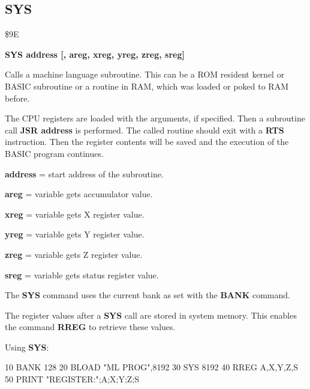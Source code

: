 
\newpage
\subsection{SYS}
\begin{description}[leftmargin=3cm,style=nextline]
\item [Token:] \$9E
\item [Format:] {\bf SYS address [, areg, xreg, yreg, zreg, sreg]}
\item [Usage:]  Calls a machine language subroutine.
                This can be a ROM resident kernel or BASIC subroutine
                or a routine in RAM, which was loaded or poked
                to RAM before.

               The CPU registers are loaded with the arguments,
               if specified. Then a subroutine call {\bf JSR address}
               is performed. The called routine should exit with
               a {\bf RTS} instruction. Then the register contents
               will be saved and the execution of the BASIC program
               continues.

               {\bf address} = start address of the subroutine.

               {\bf areg} = variable gets accumulator value.

               {\bf xreg} = variable gets X register value.

               {\bf yreg} = variable gets Y register value.

               {\bf zreg} = variable gets Z register value.

               {\bf sreg} = variable gets status register value.

                 The {\bf SYS} command uses the current bank
                 as set with the {\bf BANK} command.

\item [Remarks:] The register values after a {\bf SYS} call are stored
                 in system memory. This enables the command
                 {\bf RREG} to retrieve these values.

\item [Example:] Using {\bf SYS}:
\begin{screenoutput}
 10 BANK 128
 20 BLOAD "ML PROG",8192
 30 SYS 8192
 40 RREG A,X,Y,Z,S
 50 PRINT "REGISTER:";A;X;Y;Z;S
\end{screenoutput}
\end{description}


